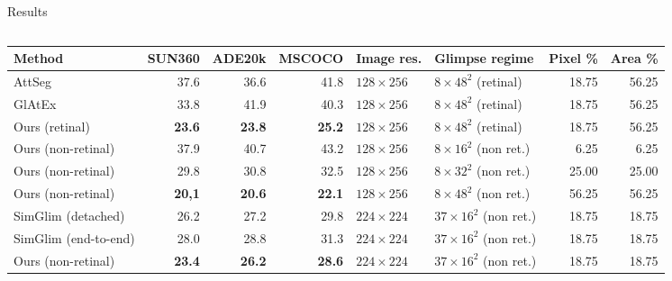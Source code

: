 \documentclass[final]{beamer}
\newlength{\colwidth}
\newlength{\twocolwid}
\begin{document}
\begin{frame}[t]
\begin{columns}[t]
\begin{column}{\twocolwid}
\begin{block}{Results}

\begin{columns}[t,totalwidth=\twocolwid]

\begin{column}{\colwidth}

\vspace{-3ex}
\begin{table}[t]
\begin{center}
\begin{sc}
\begin{footnotesize}
\begin{tabular}{l@{}rrrllrr}
\toprule
Method & SUN360 & ADE20k & MSCOCO & Image res. & Glimpse regime & Pixel \% & Area \% \\
\midrule
AttSeg & 37.6 & 36.6 & 41.8 & $128 \times 256$ & $8 \times 48^2$ (retinal) & 18.75 & 56.25 \\
GlAtEx & 33.8 & 41.9 & 40.3 & $128 \times 256$ & $8 \times 48^2$ (retinal) & 18.75 & 56.25 \\
Ours (retinal) & \textbf{23.6} & \textbf{23.8} & \textbf{25.2} & $128 \times 256$ & $8 \times 48^2$ (retinal) & 18.75 & 56.25\\
\midrule
Ours (non-retinal) & 37.9 & 40.7 & 43.2 & $128 \times 256$ & $8 \times 16^2$ (non ret.) & 6.25 & 6.25\\
Ours (non-retinal) & 29.8 & 30.8 & 32.5 & $128 \times 256$ & $8 \times 32^2$ (non ret.) & 25.00 & 25.00\\
Ours (non-retinal) & \textbf{20,1} & \textbf{20.6} & \textbf{22.1} & $128 \times 256$ & $8 \times 48^2$ (non ret.) & 56.25 & 56.25 \\
\midrule
SimGlim (detached) & 26.2 & 27.2 & 29.8 & $224 \times 224$ & $37 \times 16^2$ (non ret.) & 18.75 & 18.75\\
SimGlim (end-to-end) & 28.0 & 28.8 & 31.3 & $224 \times 224$ & $37 \times 16^2$ (non ret.) & 18.75 & 18.75 \\
Ours (non-retinal) & \textbf{23.4} & \textbf{26.2} & \textbf{28.6} & $224 \times 224$ & $37 \times 16^2$ (non ret.) & 18.75 & 18.75 \\
\bottomrule
\end{tabular}
\end{footnotesize}
\end{sc}
\end{center}

\end{table}
\end{column}
\end{columns}
\end{block}
\end{column}
\end{columns}
\end{frame}
\end{document}
